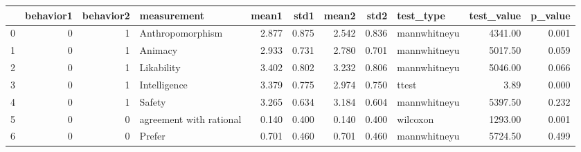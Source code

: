 \begin{tabular}{lrrlrrrrlrr}
\toprule
{} &  behavior1 &  behavior2 &              measurement &  mean1 &   std1 &  mean2 &   std2 &     test\_type &  test\_value &  p\_value \\
\midrule
0 &          0 &          1 &         Anthropomorphism &  2.877 &  0.875 &  2.542 &  0.836 &  mannwhitneyu &     4341.00 &    0.001 \\
1 &          0 &          1 &                  Animacy &  2.933 &  0.731 &  2.780 &  0.701 &  mannwhitneyu &     5017.50 &    0.059 \\
2 &          0 &          1 &               Likability &  3.402 &  0.802 &  3.232 &  0.806 &  mannwhitneyu &     5046.00 &    0.066 \\
3 &          0 &          1 &             Intelligence &  3.379 &  0.775 &  2.974 &  0.750 &         ttest &        3.89 &    0.000 \\
4 &          0 &          1 &                   Safety &  3.265 &  0.634 &  3.184 &  0.604 &  mannwhitneyu &     5397.50 &    0.232 \\
5 &          0 &          0 &  agreement with rational &  0.140 &  0.400 &  0.140 &  0.400 &      wilcoxon &     1293.00 &    0.001 \\
6 &          0 &          0 &                   Prefer &  0.701 &  0.460 &  0.701 &  0.460 &  mannwhitneyu &     5724.50 &    0.499 \\
\bottomrule
\end{tabular}
